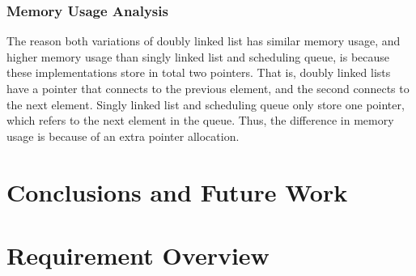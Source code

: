 \documentclass[a4paper,11pt]{kth-mag}
\begin{document}
\subsection{Memory Usage Analysis}
The reason both variations of doubly linked list has similar memory usage, and higher memory usage than singly linked list and scheduling queue, is because these implementations store in total two pointers.
That is, doubly linked lists have a pointer that connects to the previous element, and the second connects to the next element.
Singly linked list and scheduling queue only store one pointer, which refers to the next element in the queue.
Thus, the difference in memory usage is because of an extra pointer allocation.



\chapter{Conclusions and Future Work}

%
\appendix
\addappheadtotoc

\chapter{Requirement Overview}\label{app:A}
\end{document}
